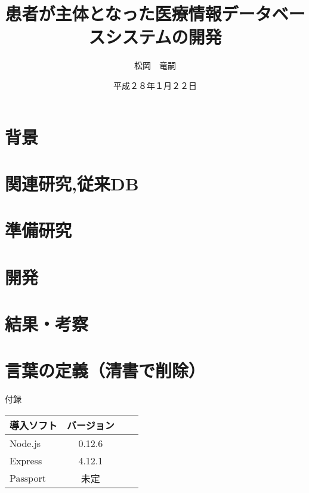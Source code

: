 \documentclass[12pt]{sotsuron}
\title{患者が主体となった医療情報データベースシステムの開発}
\author{松岡　竜嗣}
\date{平成２８年１月２２日}
\affiliation{電子機械工学専攻}
\begin{document}
\maketitle

\begin{abstract}


\end{abstract}

\tableofcontents
\clearpage


\section{背景}


\section{関連研究,従来DB}


\section{準備研究}


\section{開発}


\section{結果・考察}



\section{言葉の定義（清書で削除）}



\appendix

付録

\begin{table}[htb]
	\begin{tabular}{|l|c|r|r|}\hline
	導入ソフト & バージョン \\ \hline \hline
	Node.js & 0.12.6 \\ \hline
	Express & 4.12.1 \\ \hline
	Passport & 未定 \\ \hline
	\end{tabular}
\end{table}
\end{document}
